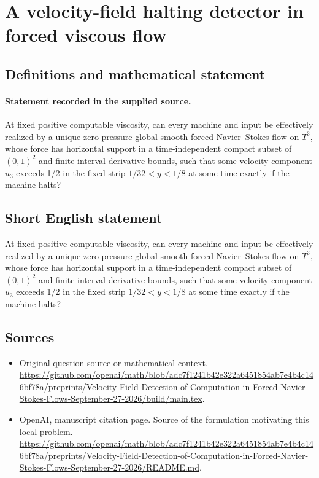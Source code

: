 \documentclass[11pt]{article}
\begin{document}
\section*{A velocity-field halting detector in forced viscous flow}\label{30007325}
\subsection{Definitions and mathematical statement}
\paragraph{Statement recorded in the supplied source.}
At fixed positive computable viscosity, can every machine and input be effectively realized by a unique zero-pressure global smooth forced Navier–Stokes flow on $T^3$, whose force has horizontal support in a time-independent compact subset of $(0,1)^2$ and finite-interval derivative bounds, such that some velocity component $u_3$ exceeds 1/2 in the fixed strip $1/32<y<1/8$ at some time exactly if the machine halts?
\subsection{Short English statement}
At fixed positive computable viscosity, can every machine and input be effectively realized by a unique zero-pressure global smooth forced Navier–Stokes flow on $T^3$, whose force has horizontal support in a time-independent compact subset of $(0,1)^2$ and finite-interval derivative bounds, such that some velocity component $u_3$ exceeds 1/2 in the fixed strip $1/32<y<1/8$ at some time exactly if the machine halts?
\subsection{Sources}
\begin{itemize}
\item[S1] Original question source or mathematical context.
\url{https://github.com/openai/math/blob/adc7f1241b42e322a6451854ab7e4b4c146bf78a/preprints/Velocity-Field-Detection-of-Computation-in-Forced-Navier-Stokes-Flows-September-27-2026/build/main.tex}.
\item[S2] OpenAI, manuscript citation page. Source of the formulation motivating this local problem.
\url{https://github.com/openai/math/blob/adc7f1241b42e322a6451854ab7e4b4c146bf78a/preprints/Velocity-Field-Detection-of-Computation-in-Forced-Navier-Stokes-Flows-September-27-2026/README.md}.
\end{itemize}
\end{document}
